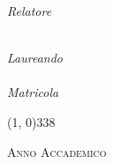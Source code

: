 \begin{titlepage}
    \begin{center}
        \begin{LARGE}
            \textbf{\myUni}\\
        \end{LARGE}

        \vspace{10pt}

        \begin{Large}
            \textsc{\myDepartment}\\
        \end{Large}

        \vspace{10pt}

        \begin{large}
            \textsc{\myFaculty}\\
        \end{large}
    \end{center}

    \vspace*{\fill}
    \begin{center}
        \begin{LARGE}
            \textbf{\myTitle}\\
        \end{LARGE}

        \vspace{20pt}

        \begin{large}
            \textsl{\myDegree}\\
        \end{large}
    \end{center}

    \vfill
    \begin{center}
        \begin{large}
            \begin{flushleft}
                \textit{Relatore}\\
                \vspace{5pt}
                \profTitle\ \myProf
            \end{flushleft}

            \begin{flushright}
                \textit{Laureando}\\
                \vspace{5pt}
                \myName \\
                \vspace{5pt}
                \textit{Matricola} \myID
            \end{flushright}
        \end{large}

        \vspace{40pt}

        \line(1, 0){338} \\
        \begin{normalsize}
            \textsc{Anno Accademico \myAA}
        \end{normalsize}
    \end{center}
\end{titlepage}
